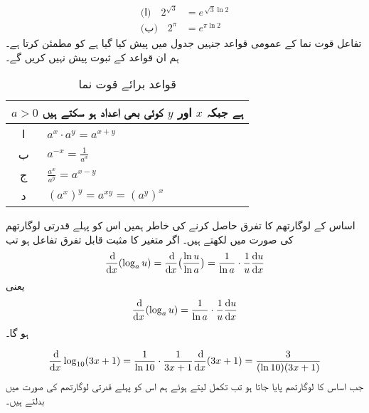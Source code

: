 \begin{align*}
\text{(ا)}\quad 2^{\sqrt{3}}&=e^{\,\sqrt{3}\ln 2}\\
\text{(ب)}\quad 2^{\pi}&=e^{\pi\ln 2}
\end{align*}
تفاعل قوت نما کے عمومی قواعد جنہیں جدول  میں پیش کیا گیا ہے کو مطمئن کرتا ہے۔ ہم ان قواعد کے ثبوت پیش نہیں کریں گے۔
\begin{table}
\caption{قواعد برائے قوت نما}
\label{جدول_ماورائی_قوت_نما_عمومی_قواعد}
\centering
\renewcommand{\arraystretch}{2} 
\begin{tabular}{c|l}
\toprule
\multicolumn{2}{c}{$a>0$ ہے جبکہ $x$ اور $y$ کوئی بھی اعداد ہو سکتے ہیں}\\
\midrule
ا&$a^x\cdot a^y=a^{x+y}$\\
ب&$a^{-x}=\frac{1}{a^x}$\\
ج&$\frac{a^x}{a^y}=a^{x-y}$\\
د&$(a^x)^y=a^{xy}=(a^y)^x$\\
\bottomrule
\end{tabular}
\end{table}

اساس  کے لوگارتھم کا تفرق حاصل کرنے کی خاطر ہمیں اس کو پہلے  قدرتی لوگارتھم  کی صورت میں لکھتے ہیں۔ اگر  متغیر  کا مثبت قابل تفرق تفاعل ہو تب
\begin{align*}
\frac{\dif}{\dif x}(\log_a u)=\frac{\dif}{\dif x}\big(\frac{\ln u}{\ln a}\big)=\frac{1}{\ln a}\cdot\frac{1}{u}\frac{\dif u}{\dif x}
\end{align*}
یعنی
\begin{align}
\frac{\dif}{\dif x}(\log_a u)=\frac{1}{\ln a}\cdot\frac{1}{u}\frac{\dif u}{\dif x}
\end{align}
ہو گا۔

\begin{align*}
\frac{\dif}{\dif x}\log_{10}(3x+1)=\frac{1}{\ln 10}\cdot\frac{1}{3x+1}\frac{\dif}{\dif x}(3x+1)=\frac{3}{(\ln 10)(3x+1)}
\end{align*}
جب اساس  کا لوگارتھم پایا جاتا ہو تب تکمل لیتے ہوئے ہم اس کو پہلے قدرتی لوگارتھم کی صورت میں بدلتے ہیں۔

